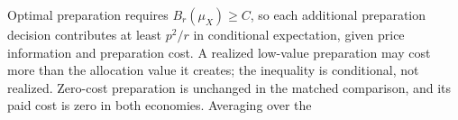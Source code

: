 
Optimal preparation requires \(B_r(\mu_X)\ge C\), so each additional
preparation decision contributes at least \(p^2/r\) in conditional
expectation, given price information and preparation cost. A realized
low-value preparation may cost more than the allocation value it
creates; the inequality is conditional, not realized. Zero-cost
preparation is unchanged in the matched comparison, and its paid cost is zero in both economies. Averaging over the
